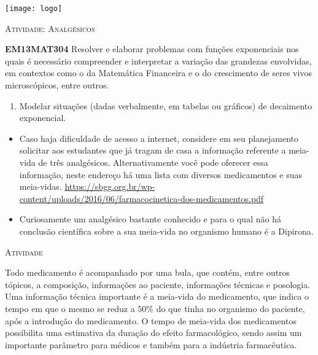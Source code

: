 \documentclass[10 pt,usenames,dvipsnames, oneside]{article}
\begin{document}
\begin{center}
  \begin{minipage}[l]{3cm}
\texttt{[image: logo]}    
\end{minipage}\hfill
\begin{minipage}[r]{.8\textwidth}
 {\Large \scshape Atividade: Analgésicos}  
\end{minipage}
\end{center}
\vspace{.2cm}

\ifdefined\prof
\begin{objetivos}
\item \textbf{EM13MAT304} Resolver e elaborar problemas com funções exponenciais nos quais é necessário compreender e interpretar a variação das grandezas envolvidas, em contextos como o da Matemática Financeira e o do crescimento de seres vivos microscópicos, entre outros. 
\end{objetivos}

\begin{goals}
\begin{enumerate}
\item Modelar situações (dadas verbalmente, em tabelas ou gráficos) de decaimento exponencial.
\end{enumerate}

\tcblower

\begin{itemize}
\item Caso haja dificuldade de acesso a internet, considere em seu planejamento solicitar aos estudantes que já tragam de casa a informação referente a meia-vida de três analgésicos. Alternativamente você pode oferecer essa informação, neste endereço há uma lista com diversos medicamentos e suas meia-vidas.  
\url{https://sbgg.org.br/wp-content/uploads/2016/06/farmacocinetica-dos-medicamentos.pdf}

\item Curiosamente um analgésico bastante conhecido e para o qual não há conclusão científica sobre a sua meia-vida no organismo humano é a Dipirona.
\end{itemize}
\end{goals}

\bigskip
\begin{center}
{\large \scshape Atividade}
\end{center}
\fi

Todo medicamento é acompanhado por uma bula, que contém, entre outros tópicos, a composição, informações ao paciente, informações técnicas e posologia. Uma informação técnica importante é a meia-vida do medicamento, que indica o tempo em que o mesmo se reduz a $50\%$ do que tinha no organismo do paciente, após a introdução do medicamento. O tempo de meia-vida dos medicamentos possibilita uma estimativa da duração do efeito farmacológico, sendo assim um importante parâmetro para médicos e também para a indústria farmacêutica.
\end{document}
